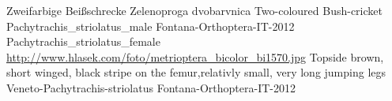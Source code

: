 {Zweifarbige Beißschrecke} %
{Zelenoproga dvobarvnica} %
{Two-coloured Bush-cricket} %
{Pachytrachis_striolatus_male} %
{Fontana-Orthoptera-IT-2012}%
{Pachytrachis_striolatus_female} %
{\url{http://www.hlasek.com/foto/metrioptera_bicolor_bi1570.jpg}} %
{Topside brown, short winged, black stripe on the femur,relativly small, very long jumping legs} %
{} %
{Veneto-Pachytrachis-striolatus} %
{Fontana-Orthoptera-IT-2012}%

